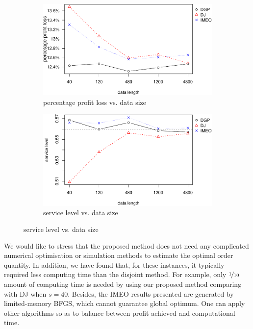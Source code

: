 \documentclass{article}
\begin{document}
\begin{figure}[ht]
\centering
\caption{Performance vs. sample size with nonlinear profit function}
\begin{subfigure}[b]{0.48\textwidth}
\centering
\includegraphics[width=\textwidth]{nonlinear-plot_files/figure-latex/ppl-1.pdf}
\caption{percentage profit loss vs. data size}
\end{subfigure}
\hfill
\begin{subfigure}[b]{0.48\textwidth}
\centering
\includegraphics[width=\textwidth]{nonlinear-plot_files/figure-latex/sl-1.pdf}
\caption{service level vs. data size}
\end{subfigure}
\label{fig:non}
\end{figure}

We would like to stress that the proposed method does not need any complicated numerical optimisation or simulation methods to estimate the optimal order quantity. In addition, we have found that, for these instances, it typically required less computing time than the disjoint method. For example, only $\nicefrac{1}{10}$ amount of computing time is needed by using our proposed method comparing with DJ when $s=40$. Besides, the IMEO results presented are generated by limited-memory BFGS, which cannot guarantee global optimum. One can apply other algorithms so as to balance between profit achieved and computational time. 
 
\end{document}
